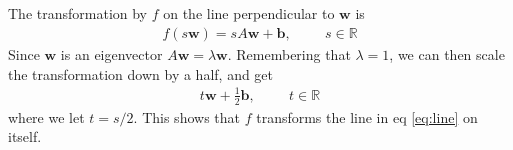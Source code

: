 \documentclass[a4paper,10pt,english]{article}
\begin{document}
\subsection{} \label{3c}
The transformation by $f$ on the line perpendicular to $\bm{w}$ is
\begin{align*}
    f(s\bm{w}) = s A \bm{w} + \bm{b}, \hspace{1cm} s \in \mathbb{R}
\end{align*}
Since $\bm{w}$ is an eigenvector $A \bm{w} = \lambda \bm{w}$. Remembering that $\lambda = 1$, we can then scale the transformation down by a half, and get
\begin{align} \label{eq:line}
    t \bm{w} + \frac{1}{2} \bm{b}, \hspace{1cm} t \in \mathbb{R}
\end{align}
where we let $t = s/2$. This shows that $f$ transforms the line in eq \ref{eq:line} on itself.
\end{document}
